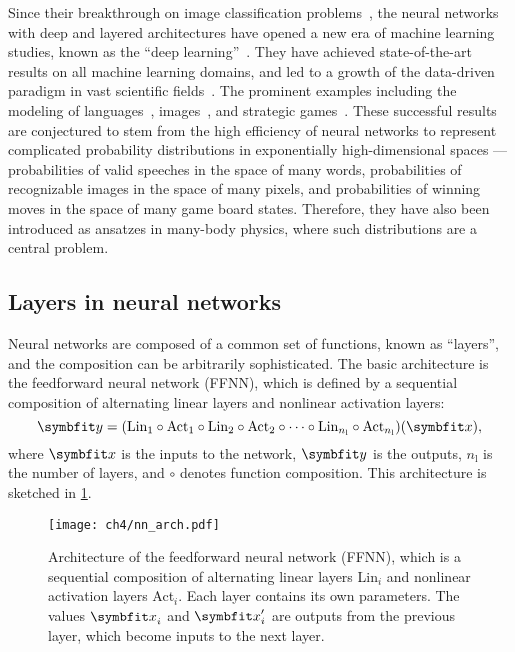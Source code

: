 Since their breakthrough on image classification problems~\cite{krizhevsky2012imagenet}, the neural networks with deep and layered architectures have opened a new era of machine learning studies, known as the ``deep learning''~\cite{goodfellow2016deep}. They have achieved state-of-the-art results on all machine learning domains, and led to a growth of the data-driven paradigm in vast scientific fields~\cite{montans2019data}. The prominent examples including the modeling of languages~\cite{brown2020language}, images~\cite{rombach2022high}, and strategic games~\cite{silver2016mastering}. These successful results are conjectured to stem from the high efficiency of neural networks to represent complicated probability distributions in exponentially high-dimensional spaces --- probabilities of valid speeches in the space of many words, probabilities of recognizable images in the space of many pixels, and probabilities of winning moves in the space of many game board states. Therefore, they have also been introduced as ansatzes in many-body physics, where such distributions are a central problem.

\subsection{Layers in neural networks}

Neural networks are composed of a common set of functions, known as ``layers'', and the composition can be arbitrarily sophisticated. The basic architecture is the feedforward neural network (FFNN), which is defined by a sequential composition of alternating linear layers and nonlinear activation layers:
\begin{equation}
\vy = (\text{Lin}_1 \circ \text{Act}_1 \circ \text{Lin}_2 \circ \text{Act}_2 \circ \cdots \circ \text{Lin}_{n_\text{l}} \circ \text{Act}_{n_\text{l}})(\vx),
\label{eq:ffnn}
\end{equation}
where $\vx$ is the inputs to the network, $\vy$ is the outputs, $n_\text{l}$ is the number of layers, and $\circ$ denotes function composition. This architecture is sketched in \cref{fig:nn-arch}.

\begin{figure}[htb]
\centering
\texttt{[image: ch4/nn\_arch.pdf]}
\caption[Architecture of feedforward neural network (FFNN)]{
Architecture of the feedforward neural network (FFNN), which is a sequential composition of alternating linear layers Lin$_i$ and nonlinear activation layers Act$_i$. Each layer contains its own parameters. The values $\vx_i$ and $\vx'_i$ are outputs from the previous layer, which become inputs to the next layer.
}
\label{fig:nn-arch}
\end{figure}

